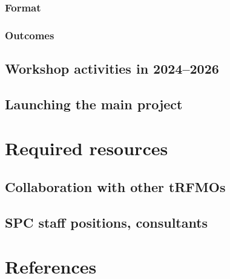 \documentclass{SCreport}
\begin{document}
\subsubsection{Format}

\subsubsection{Outcomes}

\subsection{Workshop activities in 2024--2026}

\subsection{Launching the main project}

\section{Required resources}

\subsection{Collaboration with other tRFMOs}

\subsection{SPC staff positions, consultants}

\section{References}
\end{document}
